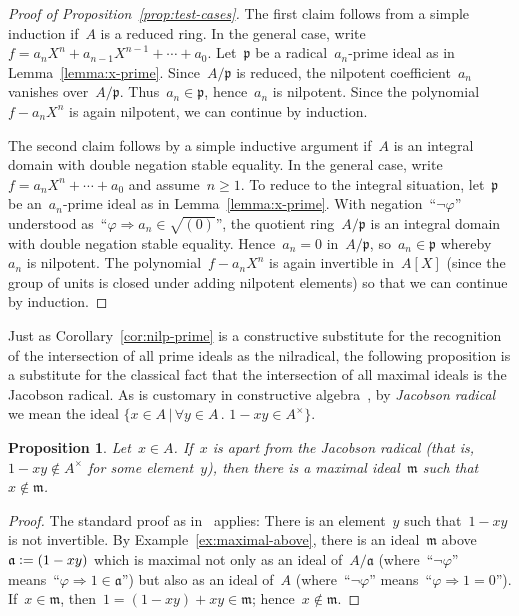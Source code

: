 \documentclass[com,11pt,crcready]{iosart2x}
\theoremstyle{definition}
\theoremstyle{plain}
\newtheorem{proposition}[definition]{Proposition}
\theoremstyle{remark}
\newcommand{\aaa}{\mathfrak{a}}
\newcommand{\mmm}{\mathfrak{m}}
\newcommand{\ppp}{\mathfrak{p}}
\newcommand{\defeq}{\vcentcolon=}
\renewcommand{\_}{\mathpunct{.}\,}
\begin{document}
\begin{proof}[Proof of Proposition~\ref{prop:test-cases}]
The first claim follows from a simple induction if~$A$ is a reduced
ring.
%
In the general case, write~$f = a_n X^n + a_{n-1} X^{n-1} + \cdots + a_0$. Let~$\ppp$
be a radical~$a_n$-prime ideal as in Lemma~\ref{lemma:x-prime}. Since~$A/\ppp$
is reduced, the nilpotent coefficient~$a_n$ vanishes over~$A/\ppp$. Thus~$a_n \in \ppp$,
hence~$a_n$ is nilpotent. Since the polynomial~$f - a_n X^n$ is again
nilpotent, we can continue by induction.

The second claim follows by a simple inductive argument if~$A$ is an
integral domain with double negation stable equality.
%
In the general case, write~$f = a_n X^n + \cdots + a_0$
and assume~$n \geq 1$. To reduce to the integral situation, let~$\ppp$ be
an~$a_n$-prime ideal as in Lemma~\ref{lemma:x-prime}.
With negation~``$\neg\varphi$'' understood as~``$\varphi \Rightarrow a_n \in
\sqrt{(0)}$'', the quotient ring~$A/\ppp$ is an integral domain with double
negation stable equality.
Hence~$a_n = 0$ in~$A/\ppp$, so~$a_n \in \ppp$ whereby~$a_n$ is nilpotent. The
polynomial~$f - a_n X^n$ is again invertible in~$A[X]$ (since the group of
units is closed under adding nilpotent elements) so that we can continue by
induction.
\end{proof}

Just as Corollary~\ref{cor:nilp-prime} is a constructive substitute
for the recognition of the intersection of all prime ideals as the nilradical,
the following proposition is a substitute for the classical fact that
the intersection of all maximal ideals is the Jacobson radical.
%
As is customary in constructive
algebra~\cite[Section~IX.1]{lombardi-quitte:constructive-algebra}, by
\emph{Jacobson radical} we mean the ideal
$\{ x \in A \,|\, \forall y \in A\_ 1 - xy \in A^\times \}$.

\begin{proposition}\label{prop:jac}Let~$x \in A$. If~$x$ is \emph{apart} from the Jacobson radical (that is, $1-xy \not\in A^\times$ for some element~$y$), then
there is a maximal ideal~$\mmm$ such that~$x \not\in \mmm$.
\end{proposition}

\begin{proof}The standard proof as
in~\cite[Lemma~IX.1.1]{lombardi-quitte:constructive-algebra} applies: There is
an element~$y$ such that~$1-xy$
is not invertible. By Example~\ref{ex:maximal-above}, there is an ideal~$\mmm$
above~$\aaa \defeq (1-xy)$ which is maximal not only as an ideal of~$A/\aaa$
(where~``$\neg\varphi$'' means~``$\varphi \Rightarrow 1 \in \aaa$'') but also as an
ideal of~$A$ (where~``$\neg\varphi$'' means~``$\varphi \Rightarrow 1 = 0$''). If~$x
\in \mmm$, then~$1 = (1-xy) + xy \in \mmm$; hence~$x \not\in \mmm$.
\end{proof}
\end{document}
